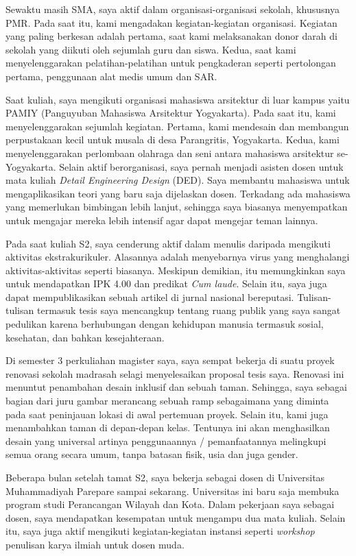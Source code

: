 \documentclass{article}
\begin{document}
Sewaktu masih SMA, saya aktif dalam organisasi-organisasi sekolah, khususnya PMR. Pada saat itu, kami mengadakan kegiatan-kegiatan organisasi. Kegiatan yang paling berkesan adalah pertama, saat kami melaksanakan donor darah di sekolah yang diikuti oleh sejumlah guru dan siswa. Kedua, saat kami menyelenggarakan pelatihan-pelatihan untuk pengkaderan seperti pertolongan pertama, penggunaan alat medis umum dan SAR.

Saat kuliah, saya mengikuti organisasi mahasiswa arsitektur di luar kampus yaitu PAMIY (Panguyuban Mahasiswa Arsitektur Yogyakarta). Pada saat itu, kami menyelenggarakan sejumlah kegiatan. Pertama, kami mendesain dan membangun perpustakaan kecil untuk musala di desa Parangritis, Yogyakarta. Kedua, kami menyelenggarakan perlombaan olahraga dan seni antara mahasiswa arsitektur se-Yogyakarta. Selain aktif berorganisasi, saya pernah menjadi asisten dosen untuk mata kuliah \textit{Detail Engineering Design} (DED). Saya membantu mahasiswa untuk mengaplikasikan teori yang baru saja dijelaskan dosen. Terkadang ada mahasiswa yang memerlukan bimbingan lebih lanjut, sehingga saya biasanya menyempatkan untuk mengajar mereka lebih intensif agar dapat mengejar teman lainnya.

Pada saat kuliah S2, saya cenderung aktif dalam menulis daripada mengikuti aktivitas ekstrakurikuler. Alasannya adalah menyebarnya virus yang menghalangi aktivitas-aktivitas seperti biasanya. Meskipun demikian, itu memungkinkan saya untuk mendapatkan IPK 4.00 dan predikat \textit{Cum laude}. Selain itu, saya juga dapat mempublikasikan sebuah artikel di jurnal nasional bereputasi. Tulisan-tulisan termasuk tesis saya mencangkup tentang ruang publik yang saya sangat pedulikan karena berhubungan dengan kehidupan manusia termasuk sosial, kesehatan, dan bahkan kesejahteraan.

Di semester 3 perkuliahan magister saya, saya sempat bekerja di suatu proyek renovasi sekolah madrasah selagi menyelesaikan proposal tesis saya.
Renovasi ini menuntut penambahan desain inklusif dan sebuah taman.
Sehingga, saya sebagai bagian dari juru gambar merancang sebuah ramp sebagaimana yang diminta pada saat peninjauan lokasi di awal pertemuan proyek. Selain itu, kami juga menambahkan taman di depan-depan kelas. Tentunya ini akan menghasilkan desain yang universal artinya penggunaannya / pemanfaatannya melingkupi semua orang secara umum, tanpa batasan fisik, usia dan juga gender.

Beberapa bulan setelah tamat S2, saya bekerja sebagai dosen di Universitas Muhammadiyah Parepare sampai sekarang.
Universitas ini baru saja membuka program studi Perancangan Wilayah dan Kota.
Dalam pekerjaan saya sebagai dosen, saya mendapatkan kesempatan untuk mengampu dua mata kuliah.
Selain itu, saya juga aktif mengikuti kegiatan-kegiatan instansi seperti \textit{workshop} penulisan karya ilmiah untuk dosen muda.
\end{document}
